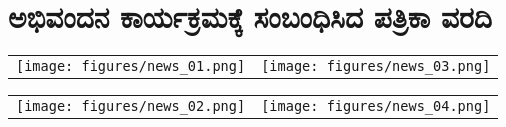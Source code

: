 {\fontsize{14}{16}\selectfont
\chapter{ಅಭಿವಂದನ ಕಾರ್ಯಕ್ರಮಕ್ಕೆ  ಸಂಬಂಧಿಸಿದ ಪತ್ರಿಕಾ ವರದಿ}

\begin{tabular}{@{}>{\centering}p{}>{\centering}p{}@{}}
\vspace{0pt}\texttt{[image: figures/news\_01.png]}&
\vspace{0pt}\texttt{[image: figures/news\_03.png]}
\end{tabular}

\begin{tabular}{@{}>{\centering}p{}>{\centering}p{}@{}}
\vspace{0pt}\texttt{[image: figures/news\_02.png]}&
\vspace{0pt}\texttt{[image: figures/news\_04.png]}
\end{tabular}


}
